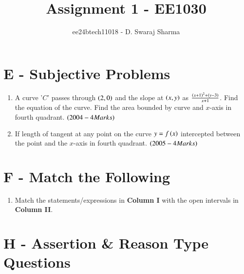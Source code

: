 \documentclass[journal,12pt,twocolumn]{IEEEtran}
\theoremstyle{remark}
\begin{document}

\vspace{3cm}

\title{Assignment 1 - EE1030}
\author{ee24btech11018 - D. Swaraj Sharma}
\maketitle
\newpage
\bigskip

\renewcommand{\thefigure}{\theenumi}
\renewcommand{\thetable}{\theenumi}

\section{E - Subjective Problems}

\begin{enumerate}[label={\arabic*.}]

	\item A curve '$C$' passes through $\left(2,0\right)$ and the slope at $\left(x,y\right)$ as $\frac{\left(x+1\right)^2+\left(y-3\right)}{x+1}$. Find the equation of the curve. Find the area bounded by curve and $x$-axis in fourth quadrant. 
		$\hfill{\brak{2004-4 Marks}}$
	
\item If length of tangent at any point on the curve $y=f\left(x\right)$ intercepted between the point and the $x$-axis in fourth quadrant. 
	$\hfill{\brak{2005-4 Marks}}$

\end{enumerate}

\section{F - Match the Following}

\begin{enumerate}

\item Match the statements/expressions in \textbf{Column I} with the open intervals in \textbf{Column II}.

\end{enumerate}

\section{H - Assertion & Reason Type Questions}
\end{document}
